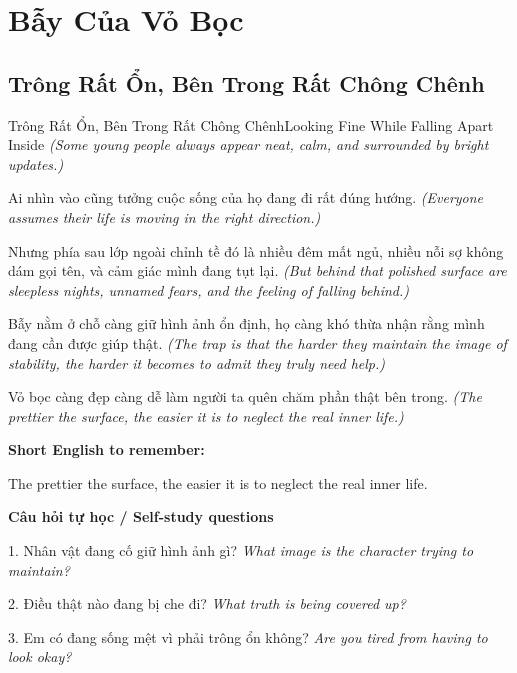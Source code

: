\chapter{Bẫy Của Vỏ Bọc}

\section{Trông Rất Ổn, Bên Trong Rất Chông Chênh}
\begin{truyen}{Trông Rất Ổn, Bên Trong Rất Chông Chênh}{Looking Fine While Falling Apart Inside}
\textit{(Some young people always appear neat, calm, and surrounded by bright updates.)}

Ai nhìn vào cũng tưởng cuộc sống của họ đang đi rất đúng hướng.
\textit{(Everyone assumes their life is moving in the right direction.)}

Nhưng phía sau lớp ngoài chỉnh tề đó là nhiều đêm mất ngủ, nhiều nỗi sợ không dám gọi tên, và cảm giác mình đang tụt lại.
\textit{(But behind that polished surface are sleepless nights, unnamed fears, and the feeling of falling behind.)}

Bẫy nằm ở chỗ càng giữ hình ảnh ổn định, họ càng khó thừa nhận rằng mình đang cần được giúp thật.
\textit{(The trap is that the harder they maintain the image of stability, the harder it becomes to admit they truly need help.)}

\end{truyen}

\begin{baihoc}
Vỏ bọc càng đẹp càng dễ làm người ta quên chăm phần thật bên trong.
\textit{(The prettier the surface, the easier it is to neglect the real inner life.)}
\end{baihoc}

\begin{ghinhoanh}
\textbf{Short English to remember:}

The prettier the surface, the easier it is to neglect the real inner life.

\end{ghinhoanh}

\begin{tuhocnhanh}
\textbf{Câu hỏi tự học / Self-study questions}

1. Nhân vật đang cố giữ hình ảnh gì? \textit{What image is the character trying to maintain?}

2. Điều thật nào đang bị che đi? \textit{What truth is being covered up?}

3. Em có đang sống mệt vì phải trông ổn không? \textit{Are you tired from having to look okay?}
\end{tuhocnhanh}
\ngancach

